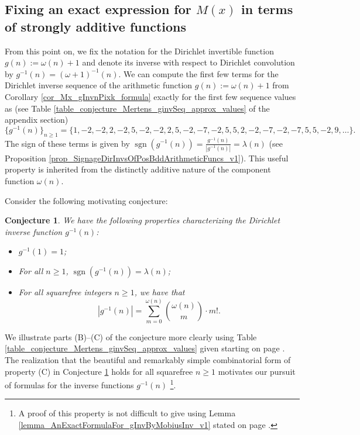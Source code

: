 \documentclass[11pt,reqno,a4letter]{article}
\numberwithin{figure}{section}
\numberwithin{table}{section}
\theoremstyle{plain}
\newtheorem{conjecture}[theorem]{Conjecture}
\numberwithin{theorem}{section}
\theoremstyle{definition}
\newcommand{\NBRef}[1]{}
\begin{document}
\subsection{Fixing an exact expression for $M(x)$ in terms of strongly additive functions} 
\label{example_InvertingARecRelForMx_Intro}

From this point on, we fix the notation for the Dirichlet invertible function $g(n) := \omega(n) + 1$ and denote its 
inverse with respect to Dirichlet convolution by $g^{-1}(n) = (\omega+1)^{-1}(n)$. 
We can compute the first few terms for the
Dirichlet inverse sequence of the arithmetic function 
$g(n) := \omega(n) + 1$ from 
Corollary \ref{cor_Mx_gInvnPixk_formula} 
exactly for the first few sequence values as 
(see Table \ref{table_conjecture_Mertens_ginvSeq_approx_values} of the appendix section) 
\[
\{g^{-1}(n)\}_{n \geq 1} = \{1, -2, -2, 2, -2, 5, -2, -2, 2, 5, -2, -7, -2, 5, 5, 2, -2, -7, -2, 
     -7, 5, 5, -2, 9, \ldots \}. 
\] 
The sign of these terms is given by $\operatorname{sgn}(g^{-1}(n)) = \frac{g^{-1}(n)}{|g^{-1}(n)|} = \lambda(n)$ 
(see Proposition \ref{prop_SignageDirInvsOfPosBddArithmeticFuncs_v1}). 
This useful property is inherited from the distinctly 
additive nature of the component function $\omega(n)$. 

Consider the following motivating conjecture: 
\NBRef{A01-2020-04-26}

\begin{conjecture}
\label{lemma_gInv_MxExample} 
We have the following properties characterizing the 
Dirichlet inverse function $g^{-1}(n)$: 
\begin{itemize} 

\item[(A)] $g^{-1}(1) = 1$; 
\item[(B)] For all $n \geq 1$, $\operatorname{sgn}(g^{-1}(n)) = \lambda(n)$; 
\item[(C)] For all squarefree integers $n \geq 1$, we have that 
     \[
     |g^{-1}(n)| = \sum_{m=0}^{\omega(n)} \binom{\omega(n)}{m} \cdot m!. 
     \]
\end{itemize} 
\end{conjecture} 

We illustrate parts (B)--(C) of the conjecture more clearly using 
Table \ref{table_conjecture_Mertens_ginvSeq_approx_values} given starting on 
page \pageref{table_conjecture_Mertens_ginvSeq_approx_values}. 
The realization that the beautiful and remarkably simple combinatorial form of property (C) 
in Conjecture \ref{lemma_gInv_MxExample} holds for all squarefree $n \geq 1$ 
motivates our pursuit of formulas for the inverse functions $g^{-1}(n)$ \footnote{ 
     A proof of this property is not difficult to give using 
     Lemma \ref{lemma_AnExactFormulaFor_gInvByMobiusInv_v1} 
     stated on page \pageref{lemma_AnExactFormulaFor_gInvByMobiusInv_v1}. 
}. 
\end{document}
